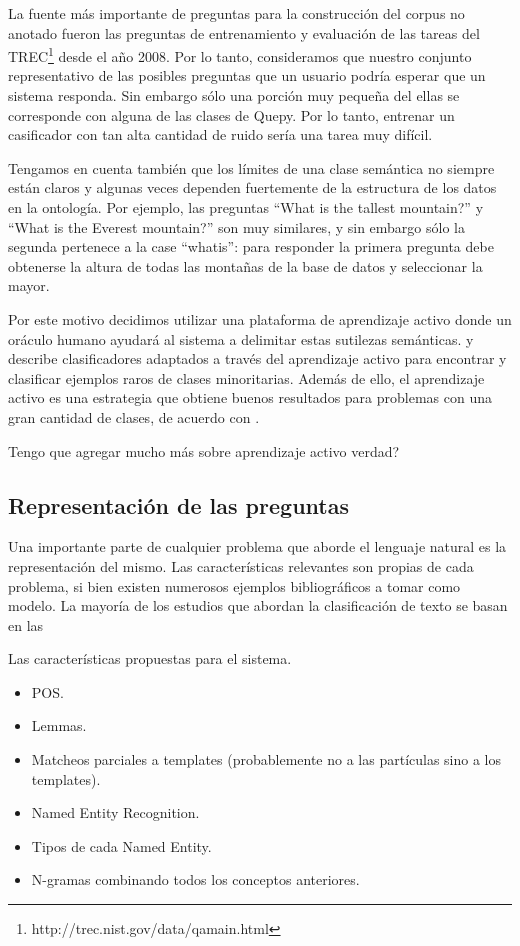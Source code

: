 La fuente más importante de preguntas para la construcción del corpus no anotado fueron las preguntas de entrenamiento y evaluación de las tareas del TREC\footnote{http://trec.nist.gov/data/qamain.html} desde el año 2008. Por lo tanto, consideramos que nuestro conjunto representativo de las posibles preguntas que un usuario podría esperar que un sistema responda. Sin embargo sólo una porción muy pequeña del ellas se corresponde con alguna de las clases de Quepy. Por lo tanto, entrenar un casificador con tan alta cantidad de ruido sería una tarea muy difícil.

Tengamos en cuenta también que los límites de una clase semántica no siempre están claros y algunas veces dependen fuertemente de la estructura de los datos en la ontología. Por ejemplo, las preguntas ``What is the tallest mountain?'' y ``What is the Everest mountain?'' son muy similares, y sin embargo sólo la segunda pertenece a la case ``whatis'': para responder la primera pregunta debe obtenerse la altura de todas las montañas de la base de datos y seleccionar la mayor.

Por este motivo decidimos utilizar una plataforma de aprendizaje activo donde un oráculo humano ayudará al sistema a delimitar estas sutilezas semánticas. \citet{rare-classes-holpedales} y \citet{AL-imbalanced-Ertekin} describe clasificadores adaptados a través del aprendizaje activo para encontrar y clasificar ejemplos raros de clases minoritarias. Además de ello, el aprendizaje activo es una estrategia que obtiene buenos resultados para problemas con una gran cantidad de clases, de acuerdo con \citet{al-multiclass-jain}.

Tengo que agregar mucho más sobre aprendizaje activo verdad?

\subsection{Representación de las preguntas}

Una importante parte de cualquier problema que aborde el lenguaje natural es la representación del mismo. Las características relevantes son propias de cada problema, si bien existen numerosos ejemplos bibliográficos a tomar como modelo.
La mayoría de los estudios que abordan la clasificación de texto se basan en las

Las características propuestas para el sistema.
\begin{itemize}
    \item POS.
    \item Lemmas.
    \item Matcheos parciales a templates (probablemente no a las partículas sino a los templates).
    \item Named Entity Recognition.
    \item Tipos de cada Named Entity.
    \item N-gramas combinando todos los conceptos anteriores.

\end{itemize}

